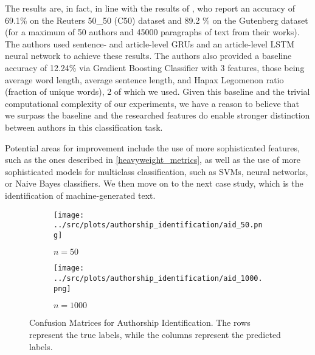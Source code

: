 The results are, in fact, in line with the results of \cite{qian_deep_nodate}, who report an accuracy of 69.1\% on the Reuters 50\_50 (C50) dataset and 89.2 \% on the Gutenberg dataset (for a maximum of 50 authors and 45000 paragraphs of text from their works). The authors used sentence- and article-level GRUs and an article-level LSTM neural network to achieve these results. The authors also provided a baseline accuracy of 12.24\% via Gradient Boosting Classifier with 3 features, those being average word length, average sentence length, and Hapax Legomenon ratio (fraction of unique words), 2 of which we used. Given this baseline and the trivial computational complexity of our experiments, we have a reason to believe that we surpass the baseline and the researched features do enable stronger distinction between authors in this classification task.

Potential areas for improvement include the use of more sophisticated features, such as the ones described in \ref{heavyweight_metrics}, as well as the use of more sophisticated models for multiclass classification, such as SVMs, neural networks, or Naive Bayes classifiers. We then move on to the next case study, which is the identification of machine-generated text.

\begin{figure}[htbp]
    \begin{subfigure}[t]{0.5\textwidth}
        \texttt{[image: ../src/plots/authorship\_identification/aid\_50.png]}
        \caption{$n=50$}\label{cn_50}
    \end{subfigure}
    \begin{subfigure}[t]{0.5\textwidth}
        \texttt{[image: ../src/plots/authorship\_identification/aid\_1000.png]}
        \caption{$n=1000$}\label{cn_1000}
    
    \end{subfigure}
    \caption{Confusion Matrices for Authorship Identification. The rows represent the true labels, while the columns represent the predicted labels.}
    \label{fig:cmatrix_authorship_identification}

\end{figure}


